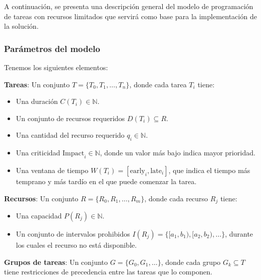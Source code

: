 \documentclass{article}
\begin{document}
A continuación, se presenta una descripción general del modelo de programación de tareas con recursos limitados que servirá como base para la implementación de la solución.

\subsubsection{Parámetros del modelo}

Tenemos los siguientes elementos:

\textbf{Tareas}: Un conjunto \( T = \{T_0, T_1, \dots, T_n\} \), donde cada tarea \( T_i \) tiene:
  \begin{itemize}
    \item Una duración \( C(T_i) \in \mathbb{N} \).
    \item Un conjunto de recursos requeridos \( D(T_i) \subseteq R \).
    \item Una cantidad del recurso requerido \( q_i \in \mathbb{N} \).
    \item Una criticidad \( \text{Impact}_i \in \mathbb{N} \), donde un valor más bajo indica mayor prioridad.
    \item Una ventana de tiempo \( W(T_i) = [\text{early}_i, \text{late}_i] \), que indica el tiempo más temprano y más tardío en el que puede comenzar la tarea.
  \end{itemize}

\textbf{Recursos}: Un conjunto \( R = \{R_0, R_1, \dots, R_m\} \), donde cada recurso \( R_j \) tiene:
  \begin{itemize}
    \item Una capacidad \( P(R_j) \in \mathbb{N} \).
    \item Un conjunto de intervalos prohibidos \( I(R_j) = \{[a_1, b_1), [a_2, b_2), \dots\} \), durante los cuales el recurso no está disponible.
  \end{itemize}

\textbf{Grupos de tareas}: Un conjunto \( G = \{G_0, G_1, \dots\} \), donde cada grupo \( G_k \subseteq T \) tiene restricciones de precedencia entre las tareas que lo componen.

\vspace{0.5cm}
\end{document}
